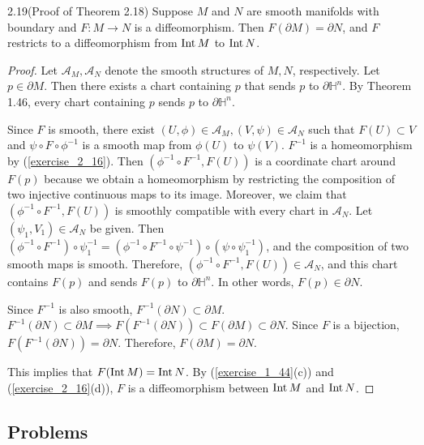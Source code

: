 \begin{customexer}{2.19(Proof of Theorem 2.18)}
  Suppose $M$ and $N$ are smooth manifolds with boundary and $F: M \rightarrow N$ is a diffeomorphism.
  Then $F(\partial M) = \partial N$, and $F$ restricts to a diffeomorphism from $\operatorname{Int} M$ to $\operatorname{Int} N$.
\end{customexer}

\begin{proof}
  Let $\mathcal{A}_M, \mathcal{A}_N$ denote the smooth structures of $M, N$, respectively.
  Let $p \in \partial M$.
  Then there exists a chart containing $p$ that sends $p$ to $\partial \mathbb{H}^n$.
  By Theorem 1.46, every chart containing $p$ sends $p$ to $\partial \mathbb{H}^n$.

  Since $F$ is smooth, there exist $(U, \phi) \in \mathcal{A}_M, (V, \psi) \in \mathcal{A}_N$ such that $F(U) \subset V$ and $\psi \circ F \circ \phi^{-1}$ is a smooth map from $\phi(U)$ to $\psi(V)$.
  $F^{-1}$ is a homeomorphism by (\ref{exercise_2_16}).
  Then $(\phi^{-1} \circ F^{-1}, F(U))$ is a coordinate chart around $F(p)$ because we obtain a homeomorphism by restricting the composition of two injective continuous maps to its image.
  Moreover, we claim that $(\phi^{-1} \circ F^{-1}, F(U))$ is smoothly compatible with every chart in $\mathcal{A}_N$.
  Let $(\psi_1, V_1) \in \mathcal{A}_N$ be given.
  Then $(\phi^{-1} \circ F^{-1}) \circ \psi_1^{-1} = (\phi^{-1} \circ F^{-1} \circ \psi^{-1}) \circ (\psi \circ \psi_1^{-1})$, and the composition of two smooth maps is smooth.
  Therefore, $(\phi^{-1} \circ F^{-1}, F(U)) \in \mathcal{A}_N$, and this chart contains $F(p)$ and sends $F(p)$ to $\partial \mathbb{H}^n$.
  In other words, $F(p) \in \partial N$.

  Since $F^{-1}$ is also smooth, $F^{-1}(\partial N) \subset \partial M$.
  $F^{-1}(\partial N) \subset \partial M \implies F(F^{-1}(\partial N)) \subset F(\partial M) \subset \partial N$.
  Since $F$ is a bijection, $F(F^{-1}(\partial N)) = \partial N$.
  Therefore, $F(\partial M) = \partial N$.

  This implies that $F(\operatorname{Int} M) = \operatorname{Int} N$.
  By (\ref{exercise_1_44}(c)) and (\ref{exercise_2_16}(d)), $F$ is a diffeomorphism between $\operatorname{Int} M$ and $\operatorname{Int} N$.
\end{proof}

\subsection{Problems}

